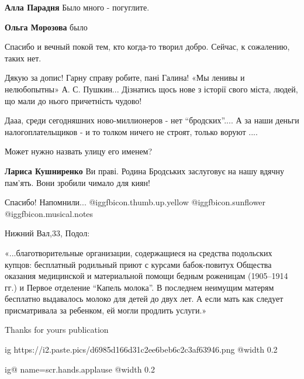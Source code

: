 \begin{itemize}
\begin{itemize}
\begin{itemize}
\end{itemize} %

\textbf{Алла Парадня} Было много - погуглите.

\textbf{Ольга Морозова} было

\end{itemize} %

Спасибо и вечный покой тем, кто когда-то творил добро. Сейчас, к сожалению, таких нет.


Дякую за допис! Гарну справу робите, пані Галина! «Мы ленивы и нелюбопытны»
А. С. Пушкин... Дізнатись щось нове з історії свого міста, людей, що мали до
нього причетність чудово!



Дааа, среди сегодняшних ново-миллионеров - нет \enquote{бродских}.... А за наши деньги
налогоплательщиков - и то толком ничего не строят, только воруют ....

Может нужно назвать улицу его именем?

\begin{itemize} %
\textbf{Лариса Кушниренко} Ви праві. Родина Бродських заслуговує на нашу вдячну пам'ять. Вони зробили чимало для киян!
\end{itemize} %

Спасибо! Напомнили... @igg{fbicon.thumb.up.yellow}  @igg{fbicon.sunflower}
@igg{fbicon.musical.notes} 


Нижний Вал,33, Подол:

«...благотворительные организации, содержащиеся на средства подольских купцов:
бесплатный родильный приют с курсами бабок-повитух Общества оказания
медицинской и материальной помощи бедным роженицам (1905–1914 гг.) и Первое
отделение \enquote{Капель молока}. В последнем неимущим матерям бесплатно выдавалось
молоко для детей до двух лет. А если мать как следует присматривала за
ребенком, ей могли продлить услуги.»


Thanks for yours publication


\ifcmt
  ig https://i2.paste.pics/d6985d166d31c2ee6beb6c2c3af63946.png
  @width 0.2
\fi


\ifcmt
  ig@ name=scr.hands.applause
  @width 0.2
\fi


\end{itemize} %
